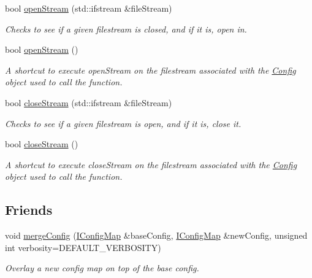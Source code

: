 \begin{DoxyCompactItemize}
bool \mbox{\hyperlink{classConfig_a9075a1a876f161230cf9b97268ac520a}{open\+Stream}} (std\+::ifstream \&file\+Stream)
\begin{DoxyCompactList}\small\item\em Checks to see if a given filestream is closed, and if it is, open in. \end{DoxyCompactList}\item 
bool \mbox{\hyperlink{classConfig_a96dde912b89cf8954cad1e472527cb2e}{open\+Stream}} ()
\begin{DoxyCompactList}\small\item\em A shortcut to execute open\+Stream on the filestream associated with the \mbox{\hyperlink{classConfig}{Config}} object used to call the function. \end{DoxyCompactList}\item 
bool \mbox{\hyperlink{classConfig_a8be2edef6f43770bf53f3ec517a74969}{close\+Stream}} (std\+::ifstream \&file\+Stream)
\begin{DoxyCompactList}\small\item\em Checks to see if a given filestream is open, and if it is, close it. \end{DoxyCompactList}\item 
bool \mbox{\hyperlink{classConfig_a1a6e966edae9532a37f48553e43274f6}{close\+Stream}} ()
\begin{DoxyCompactList}\small\item\em A shortcut to execute close\+Stream on the filestream associated with the \mbox{\hyperlink{classConfig}{Config}} object used to call the function. \end{DoxyCompactList}\end{DoxyCompactItemize}
\subsection*{Friends}
\begin{DoxyCompactItemize}
\item 
void \mbox{\hyperlink{classConfig_a4afc899a42dc9360506cf2922c5f7cb1}{merge\+Config}} (\mbox{\hyperlink{classIConfigMap}{I\+Config\+Map}} \&base\+Config, \mbox{\hyperlink{classIConfigMap}{I\+Config\+Map}} \&new\+Config, unsigned int verbosity=D\+E\+F\+A\+U\+L\+T\+\_\+\+V\+E\+R\+B\+O\+S\+I\+TY)
\begin{DoxyCompactList}\small\item\em Overlay a new config map on top of the base config. \end{DoxyCompactList}\end{DoxyCompactItemize}


